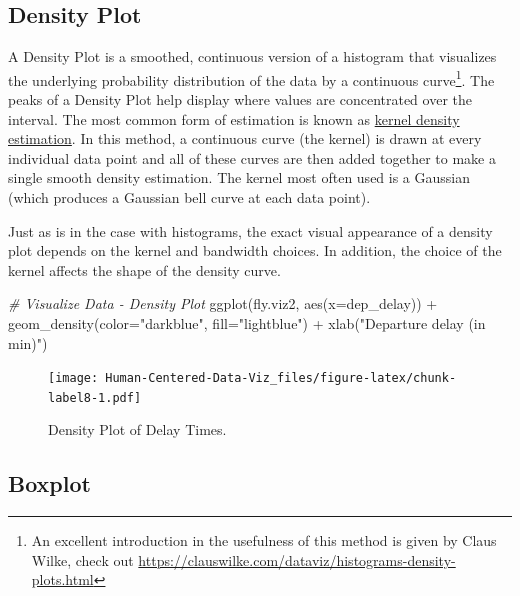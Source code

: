 \documentclass[
]{book}
\newenvironment{Shaded}{\begin{snugshade}}{\end{snugshade}}
\newcommand{\AttributeTok}[1]{\textcolor[rgb]{0.77,0.63,0.00}{#1}}
\newcommand{\CommentTok}[1]{\textcolor[rgb]{0.56,0.35,0.01}{\textit{#1}}}
\newcommand{\FunctionTok}[1]{\textcolor[rgb]{0.00,0.00,0.00}{#1}}
\newcommand{\NormalTok}[1]{#1}
\newcommand{\SpecialCharTok}[1]{\textcolor[rgb]{0.00,0.00,0.00}{#1}}
\newcommand{\StringTok}[1]{\textcolor[rgb]{0.31,0.60,0.02}{#1}}
\begin{document}
\hypertarget{density-plot}{%
\subsection{Density Plot}\label{density-plot}}

A Density Plot is a smoothed, continuous version of a histogram that visualizes the underlying probability distribution of the data by a continuous curve\footnote{An excellent introduction in the usefulness of this method is given by Claus Wilke, check out \url{https://clauswilke.com/dataviz/histograms-density-plots.html}}. The peaks of a Density Plot help display where values are concentrated over the interval. The most common form of estimation is known as \href{https://en.wikipedia.org/wiki/Kernel_density_estimation}{kernel density estimation}. In this method, a continuous curve (the kernel) is drawn at every individual data point and all of these curves are then added together to make a single smooth density estimation. The kernel most often used is a Gaussian (which produces a Gaussian bell curve at each data point).

Just as is in the case with histograms, the exact visual appearance of a density plot depends on the kernel and bandwidth choices. In addition, the choice of the kernel affects the shape of the density curve.

\begin{Shaded}
\begin{Highlighting}[]
\CommentTok{\# Visualize Data {-} Density Plot}
\FunctionTok{ggplot}\NormalTok{(fly.viz2, }\FunctionTok{aes}\NormalTok{(}\AttributeTok{x=}\NormalTok{dep\_delay)) }\SpecialCharTok{+} 
  \FunctionTok{geom\_density}\NormalTok{(}\AttributeTok{color=}\StringTok{"darkblue"}\NormalTok{, }\AttributeTok{fill=}\StringTok{"lightblue"}\NormalTok{)  }\SpecialCharTok{+}
  \FunctionTok{xlab}\NormalTok{(}\StringTok{"Departure delay (in min)"}\NormalTok{)}
\end{Highlighting}
\end{Shaded}

\begin{figure}
\centering
\texttt{[image: Human-Centered-Data-Viz\_files/figure-latex/chunk-label8-1.pdf]}
\caption{\label{fig:chunk-label8}Density Plot of Delay Times.}
\end{figure}

\hypertarget{boxplot}{%
\subsection{Boxplot}\label{boxplot}}
\end{document}
